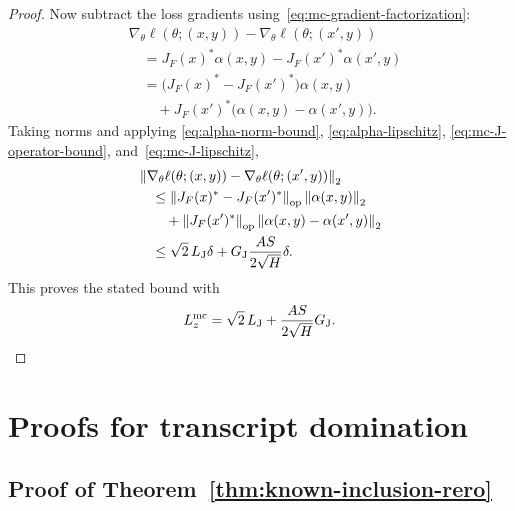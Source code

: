 \documentclass[11pt,a4paper]{report}
\theoremstyle{plain}
\theoremstyle{definition}
\theoremstyle{remark}
\newcommand{\op}{\mathrm{op}}
\newcommand{\norm}[1]{\left\lVert #1\right\rVert}
\begin{document}
\begin{proof}
Now subtract the loss gradients using~\eqref{eq:mc-gradient-factorization}:
\begin{align*}
&\nabla_\theta\ell(\theta;(x,y))
-
\nabla_\theta\ell(\theta;(x',y))\\
&\quad=
J_F(x)^\ast\alpha(x,y)-J_F(x')^\ast\alpha(x',y)\\
&\quad=
\bigl(J_F(x)^\ast-J_F(x')^\ast\bigr)\alpha(x,y)\\
&\qquad+
J_F(x')^\ast\bigl(\alpha(x,y)-\alpha(x',y)\bigr).
\end{align*}
Taking norms and applying
\eqref{eq:alpha-norm-bound}, \eqref{eq:alpha-lipschitz},
\eqref{eq:mc-J-operator-bound}, and~\eqref{eq:mc-J-lipschitz},
\begin{align*}
&\norm{\nabla_\theta\ell(\theta;(x,y))
-
\nabla_\theta\ell(\theta;(x',y))}_2\\
&\quad\le
\norm{J_F(x)^\ast-J_F(x')^\ast}_{\op}
\norm{\alpha(x,y)}_2\\
&\qquad+
\norm{J_F(x')^\ast}_{\op}
\norm{\alpha(x,y)-\alpha(x',y)}_2\\
&\quad\le
\sqrt2\,L_{\rm J}\delta
+G_{\rm J}\frac{AS}{2\sqrt H}\delta.
\end{align*}
This proves the stated bound with
\[
L_z^{\rm mc}=\sqrt2\,L_{\rm J}+\frac{AS}{2\sqrt H}G_{\rm J}.
\]
\end{proof}

\section{Proofs for transcript domination}
\label{app:transcript-proofs}

\subsection{Proof of Theorem~\ref{thm:known-inclusion-rero}}
\end{document}
